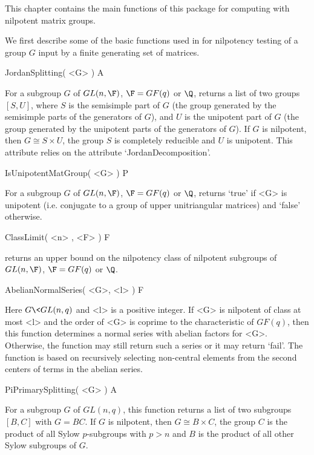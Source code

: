 

This chapter contains the main functions of this package for computing
with nilpotent matrix groups.


We first describe some of the basic functions used in
 for nilpotency testing of a group $G$ input by a
finite generating set of matrices.

\> JordanSplitting( <G> ) A

For a subgroup $G$ of $GL(n,\F)$, $\F=GF(q)$ or $\Q$, returns a list
of two groups $[S,U]$, where $S$ is the semisimple part of $G$ (the
group generated by the semisimple parts of the generators of $G$),
and $U$ is the unipotent part of $G$ (the group generated by the
unipotent parts of the generators of $G$). If $G$ is nilpotent, then
$G \cong S \times U$, the group $S$ is completely reducible and $U$
is unipotent. This attribute relies on the {\GAP} attribute
`JordanDecomposition'.

\> IsUnipotentMatGroup( <G> ) P

For a subgroup $G$ of $GL(n,\F)$, $\F=GF(q)$ or $\Q$, returns `true'
if <G> is unipotent (i.e. conjugate to a group of upper unitriangular
matrices) and `false' otherwise.

\> ClassLimit( <n> , <F> ) F

returns an upper bound on the nilpotency class of nilpotent
subgroups of $GL(n,\F)$, $\F=GF(q)$ or $\Q$.

\> AbelianNormalSeries( <G>, <l> ) F

Here $G\< GL(n,q)$ and <l> is a positive integer. If <G> is nilpotent
of class at most <l> and the order of <G> is coprime to the
characteristic of $GF(q)$, then this function determines a normal
series with abelian factors for <G>. Otherwise, the function may
still return such a series or it may return `fail'. The function is
based on recursively selecting non-central elements from the second
centers of terms in the abelian series.

\> PiPrimarySplitting( <G> ) A

For a subgroup $G$ of $GL(n,q)$, this function returns a list of
two subgroups $[B,C]$ with $G = BC$. If $G$ is nilpotent, then
$G \cong B \times C$, the group $C$ is the product of all Sylow
$p$-subgroups with $p>n$ and $B$ is the product of all other
Sylow subgroups of $G$.


